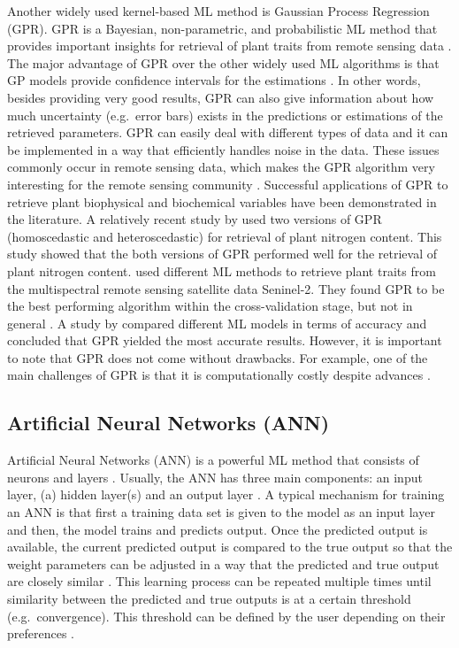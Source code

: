 \documentclass[a4paper, twoside]{templates/ociamthesis}
\begin{document}
Another widely used kernel-based ML method is Gaussian Process Regression (GPR). GPR is a Bayesian, non-parametric, and probabilistic ML method that provides important insights for retrieval of plant traits from remote sensing data \citep{camps2016survey, camps2019perspective}. The major advantage of GPR over the other widely used ML algorithms is that GP models provide confidence intervals for the estimations \citep{berger2020retrieval}. In other words, besides providing very good results, GPR can also give information about how much uncertainty (e.g.~error bars) exists in the predictions or estimations of the retrieved parameters. GPR can easily deal with different types of data and it can be implemented in a way that efficiently handles noise in the data. These issues commonly occur in remote sensing data, which makes the GPR algorithm very interesting for the remote sensing community \citep{camps2016survey, camps2019perspective}. Successful applications of GPR to retrieve plant biophysical and biochemical variables have been demonstrated in the literature. A relatively recent study by \citet{berger2020retrieval} used two versions of GPR (homoscedastic and heteroscedastic) for retrieval of plant nitrogen content. This study showed that the both versions of GPR performed well for the retrieval of plant nitrogen content. \citet{upreti2019comparison} used different ML methods to retrieve plant traits from the multispectral remote sensing satellite data Seninel-2. They found GPR to be the best performing algorithm within the cross-validation stage, but not in general \citep{upreti2019comparison}. A study by \citet{caicedo2014toward} compared different ML models in terms of accuracy and concluded that GPR yielded the most accurate results. However, it is important to note that GPR does not come without drawbacks. For example, one of the main challenges of GPR is that it is computationally costly despite advances \citep{camps2019perspective}.

\hypertarget{ann}{%
\subsection{Artificial Neural Networks (ANN)}\label{ann}}

Artificial Neural Networks (ANN) is a powerful ML method that consists of neurons and layers \citep{simon1999neural}. Usually, the ANN has three main components: an input layer, (a) hidden layer(s) and an output layer \citep{jensen1999predictive, quan2017radiative}. A typical mechanism for training an ANN is that first a training data set is given to the model as an input layer and then, the model trains and predicts output. Once the predicted output is available, the current predicted output is compared to the true output so that the weight parameters can be adjusted in a way that the predicted and true output are closely similar \citep{ingram2005mapping, quan2017radiative}. This learning process can be repeated multiple times until similarity between the predicted and true outputs is at a certain threshold (e.g.~convergence). This threshold can be defined by the user depending on their preferences \citep{jensen1999predictive, quan2017radiative}.
\end{document}
